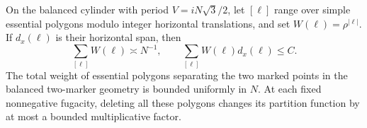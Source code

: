 \begin{proposition}
\label{prop:05-winding-suppression}
On the balanced cylinder with period \(V=iN\sqrt3/2\), let \([\ell]\) range over simple essential polygons modulo integer horizontal translations, and set \(W(\ell)=\rho^{|\ell|}\). If \(d_x(\ell)\) is their horizontal span, then
\begin{equation}
 \sum_{[\ell]}W(\ell)\asymp N^{-1},\qquad
 \sum_{[\ell]}W(\ell)d_x(\ell)\le C.
 \label{eq:05-winding-moment}
\end{equation}
The total weight of essential polygons separating the two marked points in the balanced two-marker geometry is bounded uniformly in \(N\). At each fixed nonnegative fugacity, deleting all these polygons changes its partition function by at most a bounded multiplicative factor.
\end{proposition}

